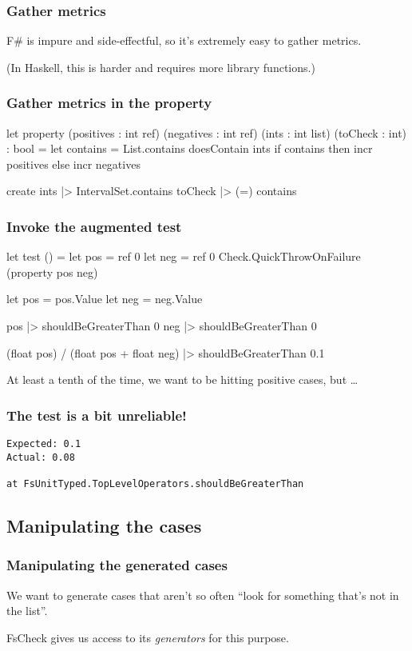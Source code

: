 \documentclass{beamer}
\begin{document}
\begin{frame}
\frametitle{Gather metrics}
F\# is impure and side-effectful, so it's extremely easy to gather metrics.

(In Haskell, this is harder and requires more library functions.)
\end{frame}

\begin{frame}[fragile]
\frametitle{Gather metrics in the property}
\begin{fslisting}
let property
    (positives : int ref) (negatives : int ref)
    (ints : int list)
    (toCheck : int)
    : bool
    =
    let contains = List.contains doesContain ints
    if contains then
        incr positives
    else
        incr negatives

    create ints
    |> IntervalSet.contains toCheck
    |> (=) contains
\end{fslisting}
\end{frame}

\begin{frame}[fragile]
\frametitle{Invoke the augmented test}
\begin{fslisting}
[<Test>]
let test () =
    let pos = ref 0
    let neg = ref 0
    Check.QuickThrowOnFailure (property pos neg)

    let pos = pos.Value
    let neg = neg.Value

    pos |> shouldBeGreaterThan 0
    neg |> shouldBeGreaterThan 0

    (float pos) / (float pos + float neg)
    |> shouldBeGreaterThan 0.1
\end{fslisting}
\end{frame}

\begin{frame}
At least a tenth of the time, we want to be hitting positive cases, but \dots
\end{frame}

\begin{frame}[fragile]
\frametitle{The test is a bit unreliable!}
\begin{verbatim}
Expected: 0.1
Actual: 0.08

at FsUnitTyped.TopLevelOperators.shouldBeGreaterThan
\end{verbatim}
\end{frame}

\subsection{Manipulating the cases}
\begin{frame}
\frametitle{Manipulating the generated cases}
We want to generate cases that aren't so often ``look for something that's not in the list''.

FsCheck gives us access to its \emph{generators} for this purpose.
\end{frame}
\end{document}
